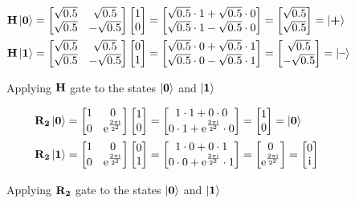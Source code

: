 \begin{figure}[H]
    \centering
    \begin{align*}
        \qth\ket{\qtz}&=\qh\qz=
        \begin{bmatrix}
            \sqrt{0.5} \cdot 1 + \sqrt{0.5} \cdot 0\\
            \sqrt{0.5} \cdot 1 - \sqrt{0.5} \cdot 0\\
        \end{bmatrix}=
        \qp=\ket{\qtp}\\
        \qth\ket{\qto}&=\qh\qo=
        \begin{bmatrix}
            \sqrt{0.5} \cdot 0 + \sqrt{0.5} \cdot 1\\
            \sqrt{0.5} \cdot 0 - \sqrt{0.5} \cdot 1\\
        \end{bmatrix}=
        \qm=\ket{\qtm}
    \end{align*}
    \caption{Applying $\qth$ gate to the states $\ket{\qtz}$ and $\ket{\qto}$}
    \label{fig:h}
\end{figure}

\begin{figure}[H]
    \centering
    \begin{align*}
        \qtr{2}\ket{\qtz}&=\qr{2}\qz=
        \begin{bmatrix}
            1 \cdot 1 + 0 \cdot 0\\
            0 \cdot 1 + \qre{2} \cdot 0\\
        \end{bmatrix}=
        \qz=\ket{\qtz}\\
        \qtr{2}\ket{\qto}&=\qr{2}\qo=
        \begin{bmatrix}
            1 \cdot 0 + 0 \cdot 1\\
            0 \cdot 0 + \qre{2} \cdot 1\\
        \end{bmatrix}=
        \begin{bmatrix}
            0\\
            \qre{2}\\
        \end{bmatrix}=
        \begin{bmatrix}
            0\\
            \mathrm{i}\\
        \end{bmatrix}
    \end{align*}
    \caption{Applying $\qtr{2}$ gate to the states $\ket{\qtz}$ and $\ket{\qto}$}
    \label{fig:r2}
\end{figure}

